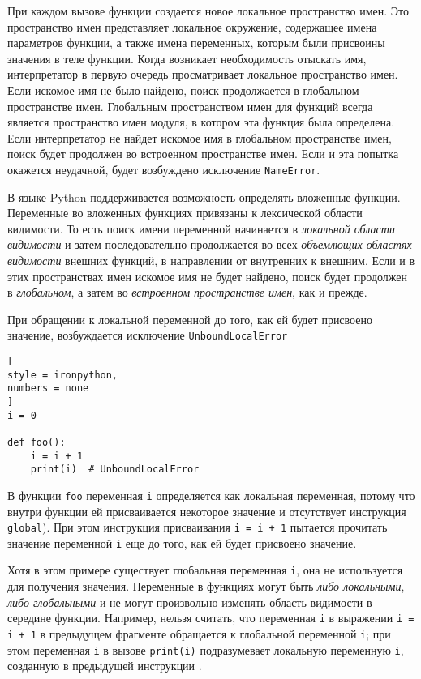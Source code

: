 \documentclass[%
	11pt,
	a4paper,
	utf8,
		]{article}
\begin{document}
При каждом вызове функции создается новое локальное пространство имен. Это пространство имен представляет локальное окружение, содержащее имена параметров функции, а также имена переменных, которым были присвоины значения в теле функции. Когда возникает необходимость отыскать имя, интерпретатор в первую очередь просматривает локальное пространство имен. Если искомое имя не было найдено, поиск продолжается в глобальном пространстве имен. Глобальным пространством имен для функций всегда является пространство имен модуля, в котором эта функция была определена. Если интерпретатор не найдет искомое имя в глобальном пространстве имен, поиск будет продолжен во встроенном пространстве имен. Если и эта попытка окажется неудачной, будет возбуждено исключение \texttt{NameError}.

В языке Python поддерживается возможность определять вложенные функции. Переменные во вложенных функциях привязаны к лексической области видимости. То есть поиск имени переменной начинается в \emph{локальной области видимости} и затем последовательно продолжается во всех \emph{объемлющих областях видимости} внешних функций, в направлении от внутренних к внешним. Если и в этих пространствах имен искомое имя не будет найдено, поиск будет продолжен в \emph{глобальном}, а затем во \emph{встроенном пространстве имен}, как и прежде.

При обращении к локальной переменной до того, как ей будет присвоено значение, возбуждается исключение \texttt{UnboundLocalError}
\begin{lstlisting}[
style = ironpython,
numbers = none	
]
i = 0

def foo():
    i = i + 1
    print(i)  # UnboundLocalError
\end{lstlisting}

В функции \texttt{foo} переменная \texttt{i} определяется как локальная переменная, потому что внутри функции ей присваивается некоторое значение и отсутствует инструкция \texttt{global}). При этом инструкция присваивания \texttt{i = i + 1} пытается прочитать значение переменной \texttt{i} еще до того, как ей будет присвоено значение. 

Хотя в этом примере существует глобальная переменная \texttt{i}, она не используется для получения значения. Переменные в функциях могут быть \emph{либо локальными}, \emph{либо глобальными} и не могут произвольно изменять область видимости в середине функции. Например, нельзя считать, что переменная \texttt{i} в выражении \texttt{i = i + 1} в предыдущем фрагменте обращается к глобальной переменной \texttt{i}; при этом переменная \texttt{i} в вызове \texttt{print(i)} подразумевает локальную переменную \texttt{i}, созданную в предыдущей инструкции \cite[]{beazley:python-2010}.
\end{document}
